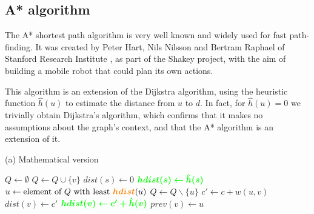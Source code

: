 \subsection{A* algorithm}
The A* shortest path algorithm is very well known and widely used for fast path-finding. It was created by Peter Hart, Nils Nilsson and Bertram Raphael of Stanford Research Institute \cite{Astar}, as part of the Shakey project, with the aim of building a mobile robot that could plan its own actions.\par
This algorithm is an extension of the Dijkstra algorithm, using the heuristic function $\hat{h}(u)$ to estimate the distance from $u$ to $d$. In fact, for $\hat{h}(u) = 0$ we trivially obtain Dijkstra's algorithm, which confirms that it makes no assumptions about the graph's context, and that the A* algorithm is an extension of it.
\begin{center}
    \begin{algorithm}[H]
        \caption[A* algorithm]{A* algorithm\\Added lines in green, changed expressions in orange, relative to Dijkstra's algorithm (Algorithm \ref{alg-dijkstra})}
        \label{alg-astar}
        \begin{minipage}[t]{0.49\linewidth}
            (a) Mathematical version
            \begin{algorithmic}[1]
                    \State $Q \gets \emptyset$
                        \State $Q \gets Q \cup \{v\}$
                    \EndFor
                    \State $dist(s) \gets 0$
                    \State $\textcolor{green}{\bm{hdist(s) \gets \hat{h}(s)}}$
                        \State $u \gets \text{element of } Q \text{ with least } \textcolor{orange}{\bm{hdist}}(u)$
                        \State $Q \gets Q \backslash \{u\}$
                            \State $c' \gets c + w(u, v)$
                                \State $dist(v) \gets c'$
                                \State $\textcolor{green}{\bm{hdist(v) \gets c'+\hat{h}(v)}}$
                                \State $prev(v) \gets u$
                            \EndIf
                        \EndFor

\end{algorithmic}
\end{minipage}
\end{algorithm}
\end{center}
